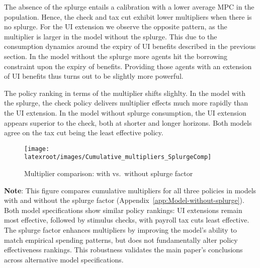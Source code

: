 \documentclass[qe]{econsocart}
\begin{document}
The absence of the splurge entails a calibration with a lower average MPC in the population.
Hence, the check and tax cut exhibit lower multipliers when there is no splurge.
For the UI extension we observe the opposite pattern, as the multiplier is larger in the model without the splurge.
This due to the consumption dynamics around the expiry of UI benefits described in the previous section.
In the model without the splurge more agents hit the borrowing constraint upon the expiry of benefits.
Providing those agents with an extension of UI benefits thus turns out to be slightly more powerful.

The policy ranking in terms of the multiplier shifts slighlty.
In the model with the splurge, the check policy delivers multiplier effects much more rapidly than the UI extension.
In the model without splurge consumption, the UI extension appears superior to the check, both at shorter and longer horizons.
Both models agree on the tax cut being the least effective policy.

\begin{figure}[H]
  \centering
  \caption{Multiplier comparison: with vs.\ without splurge factor}
  \label{fig:cumulativemultipliers_SplurgeComp} 
  \texttt{[image: \\latexroot/images/Cumulative\_multipliers\_SplurgeComp]}
\end{figure}
\noindent\parbox{\textwidth}{\footnotesize
  \textbf{Note}: This figure compares cumulative multipliers for all three policies
  in models with and without the splurge factor (Appendix~\ref{app:Model-without-splurge}).
  Both model specifications show similar policy rankings: UI extensions remain most effective,
  followed by stimulus checks, with payroll tax cuts least effective.
  The splurge factor enhances multipliers by improving the model's ability to match
  empirical spending patterns, but does not fundamentally alter policy effectiveness rankings.
  This robustness validates the main paper's conclusions across alternative model specifications.
}

\vspace{1em}  %
\end{document}
